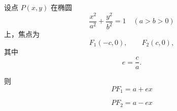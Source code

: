 设点 \(P(x,y)\) 在椭圆
\[
	\frac{x^2}{a^2}+\frac{y^2}{b^2}=1
	\quad (a>b>0)
\]
上，焦点为
\[
	F_1(-c,0),\qquad F_2(c,0),
\]
其中
\[
	e=\frac ca.
\]

则
\[
	\boxed{
		PF_1=a+ex
	}
\]

\[
	\boxed{
		PF_2=a-ex
	}
\]